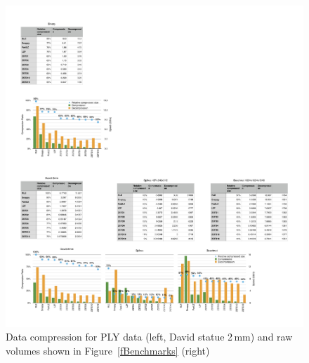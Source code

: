 \documentclass[10pt,journal,compsoc]{IEEEtran}
\newcommand{\fig}[1]{Figure~\ref{#1}}
\begin{document}
\begin{figure}[ht]\center
  \includegraphics[width=\textwidth]{images/compressorDetail}
  \caption{\label{fCompressorDetail}Data compression for PLY data (left, David
    statue 2\,mm) and raw volumes shown in \fig{fBenchmarks} (right)}
\end{figure}
\end{document}
